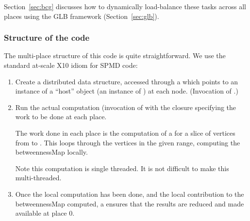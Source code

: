 Section~\ref{sec:bcg} discusses how to dynamically load-balance these
tasks across all places using the GLB framework (Section~\ref{sec:glb}). 

\subsubsection{Structure of the code}
The multi-place structure of this code is quite straightforward. We
use the standard at-scale X10 idiom for SPMD code:
\begin{enumerate}
\item Create a distributed data structure, accessed through a
   which points to an instance of a ``host''
  object (an instance of ) at each node. (Invocation of
  .) 
\item Run the actual computation (invocation of 
  with the closure specifying the work to be done at each place.

  The work done in each place is the computation of a
   for a slice of vertices from
   to . This loops through the
  vertices in the given range, computing the betweennessMap
  locally. 

  Note this computation is single threaded. It is not difficult to
  make this multi-threaded. 

\item Once the local computation has been done, and the local
  contribution to the betweennessMap computed, a
   ensures that the results are reduced and
  made available at place $0$. 
\end{enumerate}




